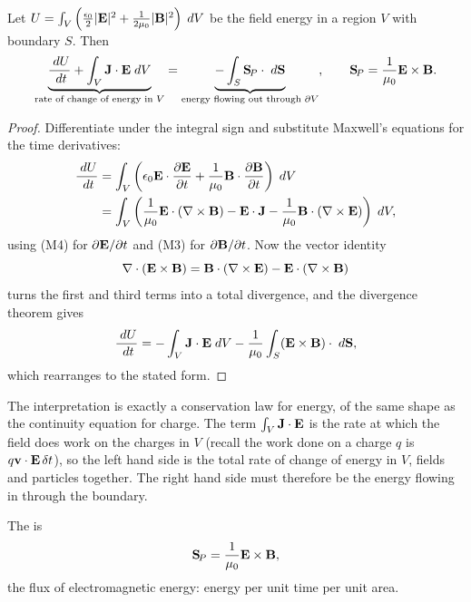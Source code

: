 \documentclass[a4paper]{scrartcl}
\begin{document}
\begin{theorem}
	Let $U = \int_V\left(\frac{\epsilon_0}{2}|\mathbf{E}|^2 + \frac{1}{2\mu_0}|\mathbf{B}|^2\right)\; d V$ be the field energy in a region $V$ with boundary $S$. Then
	$$
	\underbrace{\frac{\; d U}{\; d t} + \int_V \mathbf{J}\cdot\mathbf{E}\; d V}_{\text{rate of change of energy in } V} = \underbrace{-\int_S \mathbf{S}_{\!P}\cdot\; d\mathbf{S}}_{\text{energy flowing out through }\partial V}, \qquad \mathbf{S}_{\!P} = \frac{1}{\mu_0}\mathbf{E}\times\mathbf{B}.
	$$
\end{theorem}
\begin{proof}
	Differentiate under the integral sign and substitute Maxwell's equations for the time derivatives:
	\begin{align*}
		\frac{\; d U}{\; d t} &= \int_V \left(\epsilon_0 \mathbf{E}\cdot\frac{\partial \mathbf{E}}{\partial t} + \frac{1}{\mu_0}\mathbf{B}\cdot\frac{\partial\mathbf{B}}{\partial t}\right)\; d V\\
		&= \int_V\left(\frac{1}{\mu_0}\mathbf{E}\cdot(\nabla\times\mathbf{B}) - \mathbf{E}\cdot\mathbf{J} - \frac{1}{\mu_0}\mathbf{B}\cdot(\nabla\times\mathbf{E})\right)\; d V,
	\end{align*}
	using (M4) for $\partial\mathbf{E}/\partial t$ and (M3) for $\partial\mathbf{B}/\partial t$. Now the vector identity
	$$
	\nabla\cdot(\mathbf{E}\times\mathbf{B}) = \mathbf{B}\cdot(\nabla\times\mathbf{E}) - \mathbf{E}\cdot(\nabla\times\mathbf{B})
	$$
	turns the first and third terms into a total divergence, and the divergence theorem gives
	$$
	\frac{\; d U}{\; d t} = -\int_V \mathbf{J}\cdot\mathbf{E}\; d V - \frac{1}{\mu_0}\int_S (\mathbf{E}\times\mathbf{B})\cdot\; d\mathbf{S},
	$$
	which rearranges to the stated form.
\end{proof}

The interpretation is exactly a conservation law for energy, of the same shape as the continuity equation for charge. The term $\int_V \mathbf{J}\cdot\mathbf{E}$ is the rate at which the field does work on the charges in $V$ (recall the work done on a charge $q$ is $q\mathbf{v}\cdot\mathbf{E}\,\delta t$), so the left hand side is the total rate of change of energy in $V$, fields and particles together. The right hand side must therefore be the energy flowing in through the boundary.

\begin{definition}
	The  is
	$$
	\mathbf{S}_{\!P} = \frac{1}{\mu_0}\mathbf{E}\times\mathbf{B},
	$$
	the flux of electromagnetic energy: energy per unit time per unit area.
\end{definition}
\end{document}
